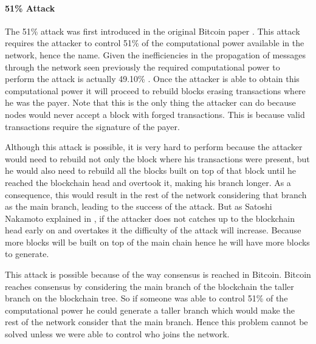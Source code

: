 \paragraph*{51\% Attack}
\label{sec:51attack}
The 51\% attack was first introduced in the original Bitcoin paper \cite{nakamoto2008bitcoin}. This attack requires the attacker to control 51\% of the computational power available in the network, hence the name. Given the inefficiencies in the propagation of messages through the network seen previously the required computational power to perform the attack is actually 49.10\% \cite{decker2013information}. Once the attacker is able to obtain this computational power it will proceed to rebuild blocks erasing transactions where he was the payer. Note that this is the only thing the attacker can do because nodes would never accept a block with forged transactions. This is because valid transactions require the signature of the payer.

Although this attack is possible, it is very hard to perform because the attacker would need to rebuild not only the block where his transactions were present, but he would also need to rebuild all the blocks built on top of that block until he reached the blockchain head and overtook it, making his branch longer. As a consequence, this would result in the rest of the network considering that branch as the main branch, leading to the success of the attack. But as Satoshi Nakamoto explained in \cite{nakamoto2008bitcoin}, if the attacker does not catches up to the blockchain head early on and overtakes it the difficulty of the attack will increase. Because more blocks will be built on top of the main chain hence he will have more blocks to generate.


This attack is possible because of the way consensus is reached in Bitcoin. Bitcoin reaches consensus by considering the main branch of the blockchain the taller branch on the blockchain tree. So if someone was able to control 51\% of the computational power he could generate a taller branch which would make the rest of the network consider that the main branch. Hence this problem cannot be solved unless we were able to control who joins the network.

